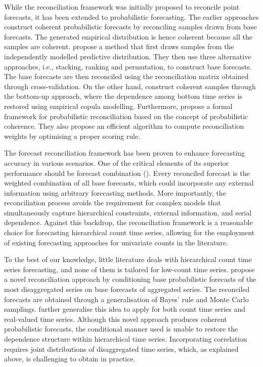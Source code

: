 \documentclass[a4paper,review,12pt,authoryear]{elsarticle}
\begin{document}
While the reconciliation framework was initially proposed to reconcile point forecasts, it has been extended to probabilistic forecasting. 
The earlier approaches construct coherent probabilistic forecasts by reconciling samples drawn from base forecasts. 
The generated empirical distribution is hence coherent because all the samples are coherent.
\cite{jeonProbabilisticForecastReconciliation2019} propose a method that first draws samples from the independently modelled predictive distribution. 
They then use three alternative approaches, i.e., stacking, ranking and permutation, to construct base forecasts. 
The base forecasts are then reconciled using the reconciliation matrix obtained through cross-validation. 
On the other hand, \cite{bentaiebHierarchicalProbabilisticForecasting2020} construct coherent samples through the bottom-up approach, 
where the dependence among bottom time series is restored using empirical copula modelling.
Furthermore, \cite{panagiotelisProbabilisticForecastReconciliation2022} propose a formal framework for probabilistic reconciliation based on the concept of probabilistic coherence. 
They also propose an efficient algorithm to compute reconciliation weights by optimising a proper scoring rule. 

The forecast reconciliation framework has been proven to enhance forecasting accuracy in various scenarios. 
One of the critical elements of its superior performance should be forecast combination (\citealp{hollymanUnderstandingForecastReconciliation2021}). 
Every reconciled forecast is the weighted combination of all base forecasts,
which could incorporate any external information using arbitrary forecasting methods.
More importantly, the reconciliation process avoids the requirement for complex models that simultaneously capture hierarchical constraints, external information, and serial dependence.
Against this backdrop, the reconciliation framework is a reasonable choice for forecasting hierarchical count time series,
allowing for the employment of existing forecasting approaches for univariate counts in the literature.

To the best of our knowledge, little literature deals with hierarchical count time series forecasting, and none of them is tailored for low-count time series.
\cite{coraniProbabilisticReconciliationCount2022} propose a novel reconciliation approach by conditioning base probabilistic forecasts of the most disaggregated series on base forecasts of aggregated series. 
The reconciled forecasts are obtained through a generalisation of Bayes’ rule and Monte Carlo samplings.
\cite{zambonEfficientProbabilisticReconciliation2022} further generalise this idea to apply for both count time series and real-valued time series.
Although this novel approach produces coherent probabilistic forecasts, 
the conditional manner used is unable to restore the dependence structure within hierarchical time series.
Incorporating correlation requires joint distributions of disaggregated time series, which, as explained above, is challenging to obtain in practice.
\end{document}
